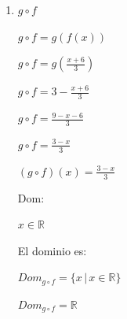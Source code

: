 \documentclass{article}
\begin{document}
\begin{enumerate}
\begin{enumerate}
\begin{enumerate}
                \( f \circ g = f(g(x)) \)
                
                \( f \circ g = f(3-x) \)
                
                \( f \circ g = \frac{3-x+6}{3} \)
                
                \( f \circ g = \frac{9-x}{3} \)
                \vspace{\baselineskip}
                
                \( (f \circ g)(x) = \frac{9-x}{3} \)
                \vspace{\baselineskip}
                
                Dom:
                
                \(x \in \mathbb{R} \)
                \vspace{\baselineskip}
                
                Así, el dominio es:
                
                \(Dom_{f \circ g} = \{x \, | \, x \in \mathbb{R}\} \)
                
                \(Dom_{f \circ g} = \mathbb{R} \)
                
                \item[2.] \(g \circ f\)

                \( g \circ f = g(f(x)) \)
                
                \( g \circ f = g\left(\frac{x+6}{3}\right) \)
                
                \( g \circ f = 3 - \frac{x+6}{3} \)
                
                \( g \circ f = \frac{9 - x - 6}{3} \)
                
                \( g \circ f = \frac{3 - x}{3} \)
                \vspace{\baselineskip}
                
                \( (g \circ f)(x) = \frac{3 - x}{3} \)
                
                Dom:
                
                \(x \in \mathbb{R} \)
                \vspace{\baselineskip}
                
                El dominio es:
                
                \(Dom_{g \circ f} = \{x \, | \, x \in \mathbb{R}\} \)
                
                \(Dom_{g \circ f} = \mathbb{R} \)
            \end{enumerate}
            \vspace{\baselineskip}
            

\end{enumerate}
\end{enumerate}
\end{document}
